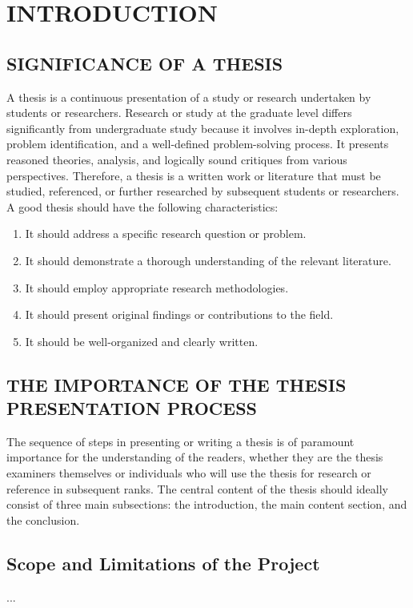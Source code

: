 \chapter{INTRODUCTION}

\section{SIGNIFICANCE OF A THESIS}
A thesis is a continuous presentation of a study or research undertaken by
students or researchers. Research or study at the graduate level differs significantly
from undergraduate study because it involves in-depth exploration, problem
identification, and a well-defined problem-solving process. It presents reasoned
theories, analysis, and logically sound critiques from various perspectives. Therefore, a
thesis is a written work or literature that must be studied, referenced, or further
researched by subsequent students or researchers. A good thesis should have the following characteristics:
\begin{enumerate}[label=\arabic*.]
    \item It should address a specific research question or problem.
    \item It should demonstrate a thorough understanding of the relevant literature.
    \item It should employ appropriate research methodologies.
    \item It should present original findings or contributions to the field.
    \item It should be well-organized and clearly written.
\end{enumerate}

\section{THE IMPORTANCE OF THE THESIS PRESENTATION PROCESS}
The sequence of steps in presenting or writing a thesis is of paramount
importance for the understanding of the readers, whether they are the thesis
examiners themselves or individuals who will use the thesis for research or reference
in subsequent ranks. The central content of the thesis should ideally consist of three
main subsections: the introduction, the main content section, and the conclusion.

\section{Scope and Limitations of the Project}
...
